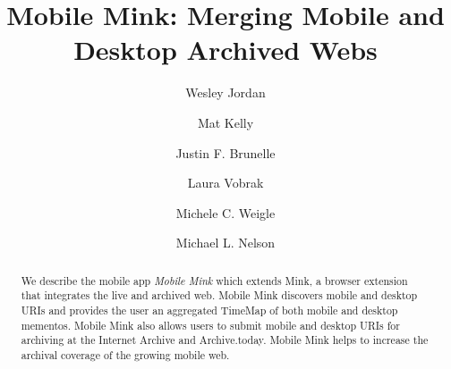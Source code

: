 \documentclass{sig-alternate-2013}
\begin{document}
\title{Mobile Mink: Merging Mobile and Desktop Archived Webs}




\author[1]{Wesley Jordan}
\author[2]{Mat Kelly}
\author[2,3]{Justin F. Brunelle}
\author[1]{Laura Vobrak}
\author[2]{Michele C. Weigle}
\author[2]{Michael L. Nelson}

       
\maketitle
\begin{abstract}
We describe the mobile app \emph{Mobile Mink} which extends Mink, a browser extension that integrates the live and archived web. Mobile Mink discovers mobile and desktop URIs and provides the user an aggregated TimeMap of both mobile and desktop mementos. Mobile Mink also allows users to submit mobile and desktop URIs for archiving at the Internet Archive and Archive.today. Mobile Mink helps to increase the archival coverage of the growing mobile web.
\end{abstract}


\end{document}
